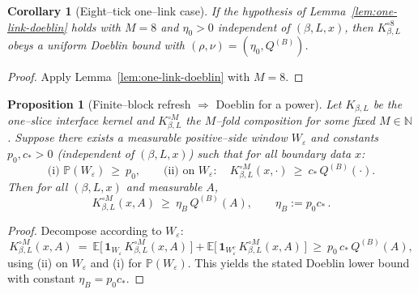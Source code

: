 \documentclass[11pt]{amsart}
\theoremstyle{plain}
\newtheorem{proposition}[theorem]{Proposition}
\newtheorem{corollary}[theorem]{Corollary}
\theoremstyle{definition}
\theoremstyle{remark}
\begin{document}
\begin{corollary}[Eight--tick one--link case]\label{cor:8tick-one-link}
If the hypothesis of Lemma~\ref{lem:one-link-doeblin} holds with $M=8$ and $\eta_0>0$ independent of $(\beta,L,x)$, then $K_{\beta,L}^{\circ 8}$ obeys a uniform Doeblin bound with $(\rho,\nu)=(\eta_0, Q^{(B)})$.
\end{corollary}
\begin{proof}
Apply Lemma~\ref{lem:one-link-doeblin} with $M=8$.
\end{proof}

\begin{proposition}[Finite--block refresh $\Rightarrow$ Doeblin for a power]\label{prop:block-refresh-doeblin}
Let $K_{\beta,L}$ be the one--slice interface kernel and $K_{\beta,L}^{\circ M}$ the $M$--fold composition for some fixed $M\in\mathbb N$. Suppose there exists a measurable positive--side window $W_\varepsilon$ and constants $p_0,c_*>0$ (independent of $(\beta,L,x)$) such that for all boundary data $x$:
\[
  \text{(i) }\mathbb P(W_\varepsilon)\ \ge\ p_0,\qquad
  \text{(ii) on }W_\varepsilon:\quad K_{\beta,L}^{\circ M}(x,\cdot)\ \ge\ c_*\, Q^{(B)}(\cdot).
\]
Then for all $(\beta,L,x)$ and measurable $A$,
\[
  K_{\beta,L}^{\circ M}(x,A)\ \ge\ \eta_B\, Q^{(B)}(A),\qquad \eta_B:=p_0 c_*\,.
\]
\end{proposition}
\begin{proof}
Decompose according to $W_\varepsilon$:
\[
  K_{\beta,L}^{\circ M}(x,A)
   \ =\ \mathbb E\big[\,\mathbf 1_{W_\varepsilon}\, K_{\beta,L}^{\circ M}(x,A)\,\big]
       + \mathbb E\big[\,\mathbf 1_{W_\varepsilon^c}\, K_{\beta,L}^{\circ M}(x,A)\,\big]
   \ \ge\ p_0\, c_*\, Q^{(B)}(A),
\]
using (ii) on $W_\varepsilon$ and (i) for $\mathbb P(W_\varepsilon)$. This yields the stated Doeblin lower bound with constant $\eta_B=p_0 c_*$. 
\end{proof}
\end{document}
